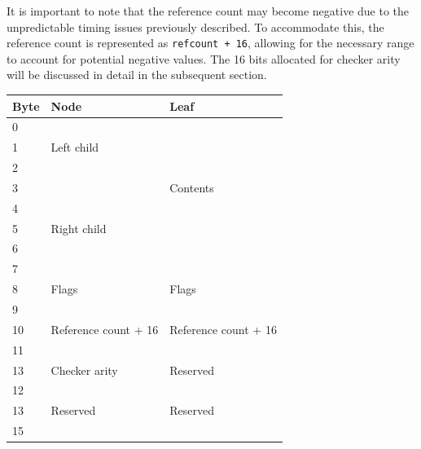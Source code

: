 \documentclass{IEEEtran}
\begin{document}
\par It is important to note that the reference count may become negative due to the unpredictable timing issues previously described. To accommodate this, the reference count is represented as \texttt{refcount + 16}, allowing for the necessary range to account for potential negative values. The 16 bits allocated for checker arity will be discussed in detail in the subsequent section.

\begin{table}[!ht]
        \centering

\begin{tabular}{p{}p{}p{}}
Byte & Node & Leaf \\
\hline
 \multicolumn{1}{|l|}{0} & \multicolumn{1}{l|}{} & \multicolumn{1}{l|}{} \\
\cline{1-1}
 \multicolumn{1}{|l|}{1} & \multicolumn{1}{l|}{Left child} & \multicolumn{1}{l|}{} \\
\cline{1-1}
 \multicolumn{1}{|l|}{2} & \multicolumn{1}{l|}{} & \multicolumn{1}{l|}{} \\
\cline{1-1}
 \multicolumn{1}{|l|}{3} & \multicolumn{1}{l|}{} & \multicolumn{1}{l|}{Contents} \\
\cline{1-2}
 \multicolumn{1}{|l|}{4} & \multicolumn{1}{l|}{} & \multicolumn{1}{l|}{} \\
\cline{1-1}
 \multicolumn{1}{|l|}{5} & \multicolumn{1}{l|}{Right child} & \multicolumn{1}{l|}{} \\
\cline{1-1}
 \multicolumn{1}{|l|}{6} & \multicolumn{1}{l|}{} & \multicolumn{1}{l|}{} \\
\cline{1-1}
 \multicolumn{1}{|l|}{7} & \multicolumn{1}{l|}{} & \multicolumn{1}{l|}{} \\
\hline
 \multicolumn{1}{|l|}{8} & \multicolumn{1}{l|}{Flags} & \multicolumn{1}{l|}{Flags} \\
\cline{1-1}
 \multicolumn{1}{|l|}{9} & \multicolumn{1}{l|}{} & \multicolumn{1}{l|}{} \\
\hline
 \multicolumn{1}{|l|}{10} & \multicolumn{1}{l|}{Reference count + 16} & \multicolumn{1}{l|}{Reference count + 16} \\
\cline{1-1}
 \multicolumn{1}{|l|}{11} & \multicolumn{1}{l|}{} & \multicolumn{1}{l|}{} \\
\hline
 \multicolumn{1}{|l|}{13} & \multicolumn{1}{l|}{Checker arity} & \multicolumn{1}{l|}{Reserved} \\
\cline{1-1}
 \multicolumn{1}{|l|}{12} & \multicolumn{1}{l|}{} & \multicolumn{1}{l|}{} \\
\hline
 \multicolumn{1}{|l|}{13} & \multicolumn{1}{l|}{Reserved} & \multicolumn{1}{l|}{Reserved} \\
\cline{1-1}
 \multicolumn{1}{|l|}{15} & \multicolumn{1}{l|}{} & \multicolumn{1}{l|}{} \\
 \hline
\end{tabular}
\end{table}
\end{document}
